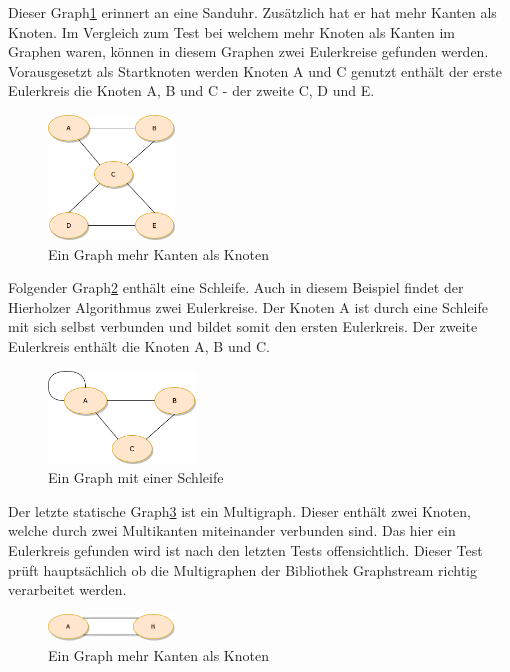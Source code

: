 Dieser Graph\ref{fig:fewerNodesThanEdges} erinnert an eine Sanduhr. Zusätzlich hat er hat mehr Kanten als Knoten. Im Vergleich zum Test bei welchem mehr Knoten als Kanten im Graphen waren, können in diesem Graphen zwei Eulerkreise gefunden werden. Vorausgesetzt als Startknoten werden Knoten A und C genutzt enthält der erste Eulerkreis die Knoten A, B und C - der zweite C, D und E. 

\begin{figure}[htbp]
	\centering
		\includegraphics[width=0.3\textwidth]{Latex/Figs/fewerNodesThanEdges.png}		
	\caption{Ein Graph mehr Kanten als Knoten}
	\label{fig:fewerNodesThanEdges}
\end{figure}

Folgender Graph\ref{fig:loop} enthält eine Schleife. Auch in diesem Beispiel findet der Hierholzer Algorithmus zwei Eulerkreise. Der Knoten A ist durch eine Schleife mit sich selbst verbunden und bildet somit den ersten Eulerkreis. Der zweite Eulerkreis enthält die Knoten A, B und C.

\begin{figure}[htbp]
	\centering
		\includegraphics[width=0.35\textwidth]{Latex/Figs/loop.png}		
	\caption{Ein Graph mit einer Schleife}
	\label{fig:loop}
\end{figure}

\newpage

Der letzte statische Graph\ref{fig:multiedge} ist ein Multigraph. Dieser enthält zwei Knoten, welche durch zwei Multikanten miteinander verbunden sind. Das hier ein Eulerkreis gefunden wird ist nach den letzten Tests offensichtlich. Dieser Test prüft hauptsächlich ob die Multigraphen der Bibliothek Graphstream richtig verarbeitet werden.

\begin{figure}[htbp]
	\centering
		\includegraphics[width=0.3\textwidth]{Latex/Figs/twoNodesMultiEdge.png}		
	\caption{Ein Graph mehr Kanten als Knoten}
	\label{fig:multiedge}
\end{figure}